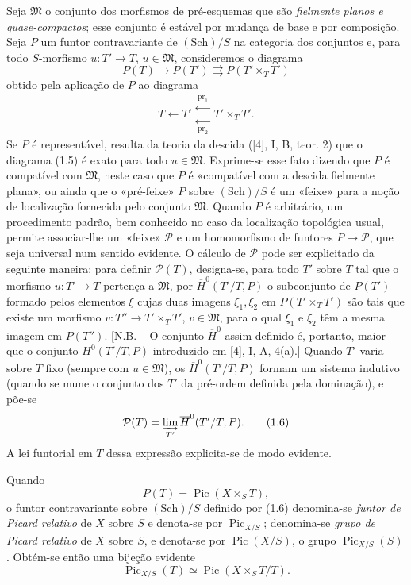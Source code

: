 Seja $\mathfrak M$ o conjunto dos morfismos de pré-esquemas que são
\emph{fielmente planos e quase-compactos}; esse conjunto é estável por mudança
de base e por composição. Seja $P$ um funtor contravariante de
$(\mathrm{Sch})/S$ na categoria dos conjuntos e, para todo $S$-morfismo
$u:T'\longrightarrow T$, $u\in\mathfrak M$, consideremos o diagrama
\begin{equation}
P(T)\longrightarrow P(T')\rightrightarrows P(T'\times_TT')
\tag{1.5}
\end{equation}
obtido pela aplicação de $P$ ao diagrama
\[
T\longleftarrow T'\mathrel{\substack{\xleftarrow{\,\mathrm{pr}_1\,}\\[-0.35ex]
\xleftarrow[\,\mathrm{pr}_2\,]{}}}T'\times_TT'.
\]
Se $P$ é representável, resulta da teoria da descida ([4], I, B, teor. 2) que
o diagrama (1.5) é exato para todo $u\in\mathfrak M$. Exprime-se esse fato
dizendo que $P$ é compatível com $\mathfrak M$, neste caso que $P$ é
«compatível com a descida fielmente plana», ou ainda que o «pré-feixe» $P$
sobre $(\mathrm{Sch})/S$ é um «feixe» para a noção de localização fornecida
pelo conjunto $\mathfrak M$. Quando $P$ é arbitrário, um procedimento padrão,
bem conhecido no caso da localização topológica usual, permite associar-lhe
um «feixe» $\mathcal P$ e um homomorfismo de funtores
$P\longrightarrow\mathcal P$, que seja universal num sentido evidente. O
cálculo de $\mathcal P$ pode ser explicitado da seguinte maneira: para definir
$\mathcal P(T)$, designa-se, para todo $T'$ sobre $T$ tal que o morfismo
$u:T'\longrightarrow T$ pertença a $\mathfrak M$, por
$\overline H^0(T'/T,P)$ o subconjunto de $P(T')$ formado pelos elementos $\xi$
cujas duas imagens $\xi_1,\xi_2$ em $P(T'\times_TT')$ são tais que existe um
morfismo $v:T''\longrightarrow T'\times_TT'$, $v\in\mathfrak M$, para o qual
$\xi_1$ e $\xi_2$ têm a mesma imagem em $P(T'')$. [N.B. -- O conjunto
$\overline H^0$ assim definido é, portanto, maior que o conjunto
$H^0(T'/T,P)$ introduzido em [4], I, A, 4(a).] Quando $T'$ varia sobre $T$
fixo (sempre com $u\in\mathfrak M$), os $\overline H^0(T'/T,P)$ formam um
sistema indutivo (quando se mune o conjunto dos $T'$ da pré-ordem definida pela
dominação), e põe-se
\begin{equation}
\mathcal P(T)=\varinjlim_{T'}\overline H^0(T'/T,P).
\tag{1.6}
\end{equation}
A lei funtorial em $T$ dessa expressão explicita-se de modo evidente.

Quando
\[
P(T)=\operatorname{Pic}(X\times_ST),
\]
o funtor contravariante sobre $(\mathrm{Sch})/S$ definido por (1.6) denomina-se
\emph{funtor de Picard relativo} de $X$ sobre $S$ e denota-se por
$\operatorname{Pic}_{X/S}$; denomina-se \emph{grupo de Picard relativo} de
$X$ sobre $S$, e denota-se por $\operatorname{Pic}(X/S)$, o grupo
$\operatorname{Pic}_{X/S}(S)$. Obtém-se então uma bijeção evidente
\begin{equation}
\operatorname{Pic}_{X/S}(T)\simeq\operatorname{Pic}(X\times_ST/T).
\tag{1.7}
\end{equation}

